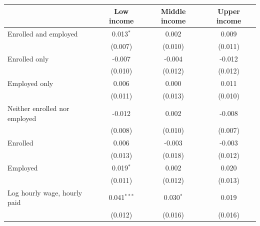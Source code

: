 \begin{tabular}{lccc}
\toprule
 & Low income & Middle income & Upper income \\
\midrule
Enrolled and employed & 0.013$^{*}$ & 0.002 & 0.009 \\
 & (0.007) & (0.010) & (0.011) \\
Enrolled only & -0.007 & -0.004 & -0.012 \\
 & (0.010) & (0.012) & (0.012) \\
Employed only & 0.006 & 0.000 & 0.011 \\
 & (0.011) & (0.013) & (0.010) \\
Neither enrolled nor employed & -0.012 & 0.002 & -0.008 \\
 & (0.008) & (0.010) & (0.007) \\
Enrolled & 0.006 & -0.003 & -0.003 \\
 & (0.013) & (0.018) & (0.012) \\
Employed & 0.019$^{*}$ & 0.002 & 0.020 \\
 & (0.011) & (0.012) & (0.013) \\
Log hourly wage, hourly paid & 0.041$^{***}$ & 0.030$^{*}$ & 0.019 \\
 & (0.012) & (0.016) & (0.016) \\
\bottomrule
\end{tabular}

